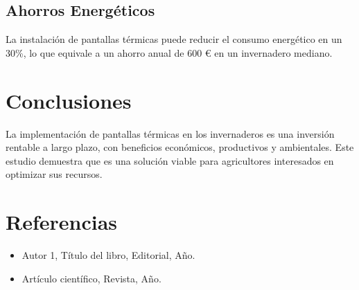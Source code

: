 \begin{Form}
\subsection{Ahorros Energéticos}
La instalación de pantallas térmicas puede reducir el consumo energético en un 30\%, lo que equivale a un ahorro anual de 600 € en un invernadero mediano.

\section{Conclusiones}
La implementación de pantallas térmicas en los invernaderos es una inversión rentable a largo plazo, con beneficios económicos, productivos y ambientales. Este estudio demuestra que es una solución viable para agricultores interesados en optimizar sus recursos.



















\section{Referencias}
\begin{itemize}
    \item Autor 1, Título del libro, Editorial, Año.
    \item Artículo científico, Revista, Año.
\end{itemize}

\end{Form}

